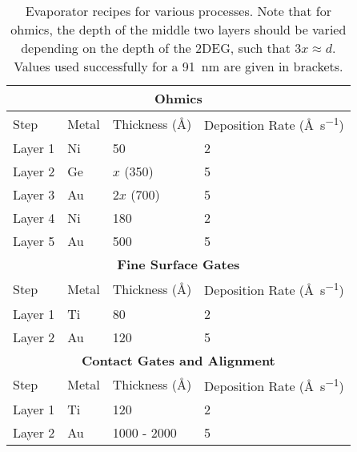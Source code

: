 \begin{table}
    \centering
    \begin{tabular}{|l|l|l|l|}
        \multicolumn{4}{c}{\textbf{Ohmics}}\\
        \hline
        Step & Metal & Thickness (\si{\angstrom}) & Deposition Rate (\si{\angstrom\per\second}) \\
        \hline
        Layer 1 & Ni & 50          & 2 \\
        Layer 2 & Ge & $x$  (350)  & 5 \\
        Layer 3 & Au & $2x$ (700)  & 5 \\
        Layer 4 & Ni & 180         & 2 \\
        Layer 5 & Au & 500  & 5 \\
        \hline

        \multicolumn{4}{c}{\textbf{Fine Surface Gates}}\\
        \hline
        Step & Metal & Thickness (\si{\angstrom}) & Deposition Rate (\si{\angstrom\per\second}) \\
        \hline
        Layer 1 & Ti & 80  & 2 \\
        Layer 2 & Au & 120 & 5 \\
        \hline

        \multicolumn{4}{c}{\textbf{Contact Gates and Alignment}}\\
        \hline
        Step & Metal & Thickness (\si{\angstrom}) & Deposition Rate (\si{\angstrom\per\second}) \\
        \hline
        Layer 1 & Ti & 120         & 2 \\
        Layer 2 & Au & 1000 - 2000 & 5 \\
        \hline
    \end{tabular}
    \caption[Evaporator recipes]
    {Evaporator recipes for various processes. Note that for ohmics, the depth of the middle two layers should be varied
    depending on the depth of the 2DEG, such that $3x \approx d$. Values used successfully for a \SI{91}{\nano\meter} are given
    in brackets.
    }
    \label{tab:evap}
\end{table}



